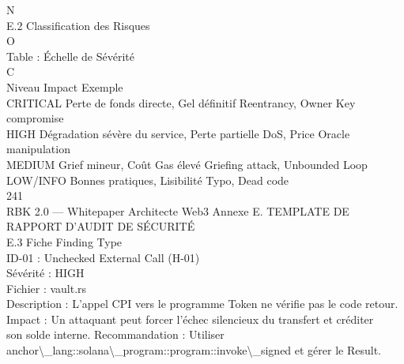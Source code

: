 \documentclass[12pt,landscape,a4paper]{article}
\begin{document}
N\\
E.2 Classification des Risques\\
O\\
\vspace{0.5em}
Table : Échelle de Sévérité\\
C\\
\vspace{0.5em}
\vspace{0.5em}
Niveau   Impact                                         Exemple\\
CRITICAL Perte de fonds directe, Gel définitif          Reentrancy, Owner Key compromise\\
HIGH     Dégradation sévère du service, Perte partielle DoS, Price Oracle manipulation\\
MEDIUM   Grief mineur, Coût Gas élevé                   Griefing attack, Unbounded Loop\\
LOW/INFO Bonnes pratiques, Lisibilité                   Typo, Dead code\\
\vspace{0.5em}
\vspace{0.5em}
\vspace{0.5em}
\vspace{0.5em}
241\\
RBK 2.0 — Whitepaper Architecte Web3                                                             Annexe E. TEMPLATE DE RAPPORT D’AUDIT DE SÉCURITÉ\\
\vspace{0.5em}
\vspace{0.5em}
\vspace{0.5em}
E.3 Fiche Finding Type\\
ID-01 : Unchecked External Call (H-01)\\
\vspace{0.5em}
Sévérité : HIGH\\
Fichier : vault.rs\\
Description : L’appel CPI vers le programme Token ne vérifie pas le code retour. Impact : Un attaquant peut forcer l’échec silencieux du transfert et créditer\\
son solde interne. Recommandation : Utiliser anchor\textbackslash{}_lang::solana\textbackslash{}_program::program::invoke\textbackslash{}_signed et gérer le Result.\\
\vspace{0.5em}
\vspace{0.5em}
\vspace{0.5em}
\vspace{0.5em}
\end{document}
